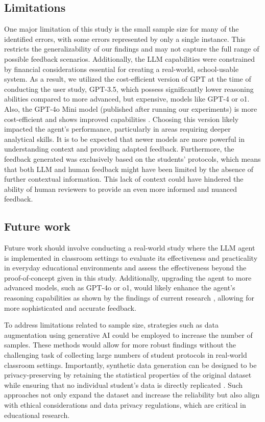 \subsection{Limitations}

One major limitation of this study is the small sample size for many of the identified errors, with some errors represented by only a single instance. This restricts the generalizability of our findings and may not capture the full range of possible feedback scenarios. 
Additionally, the LLM capabilities were constrained by financial considerations essential for creating a real-world, school-usable system. As a result, we utilized the cost-efficient version of GPT at the time of conducting the user study, GPT-3.5, which possess significantly lower reasoning abilities compared to more advanced, but expensive, models like GPT-4 or o1. Also, the GPT-4o Mini model (published after running our experiments) is more cost-efficient and shows improved capabilities \citep{sessler2024benchmarking}. 
Choosing this version likely impacted the agent's performance, particularly in areas requiring deeper analytical skills. It is to be expected that newer models are more powerful in understanding context and providing adapted feedback. 
Furthermore, the feedback generated was exclusively based on the students' protocols, which means that both LLM and human feedback might have been limited by the absence of further contextual information. This lack of context could have hindered the ability of human reviewers to provide an even more informed and nuanced feedback.

\subsection{Future work}

Future work should involve conducting a real-world study where the LLM agent is implemented in classroom settings to evaluate its effectiveness and practicality in everyday educational environments and assess the effectiveness beyond the proof-of-concept given in this study. Additionally, upgrading the agent to more advanced models, such as GPT-4o or o1, would likely enhance the agent’s reasoning capabilities as shown by the findings of current research \citep{sessler2024can, latif2024systematic}, allowing for more sophisticated and accurate feedback. 

To address limitations related to sample size, strategies such as data augmentation using generative AI \citep{kieser2023educational} could be employed to increase the number of samples. These methods would allow for more robust findings without the challenging task of collecting large numbers of student protocols in real-world classroom settings.
Importantly, synthetic data generation can be designed to be privacy-preserving by retaining the statistical properties of the original dataset while ensuring that no individual student’s data is directly replicated \citep{vie2022privacy}. Such approaches not only expand the dataset and increase the reliability but also align with ethical considerations and data privacy regulations, which are critical in educational research.

